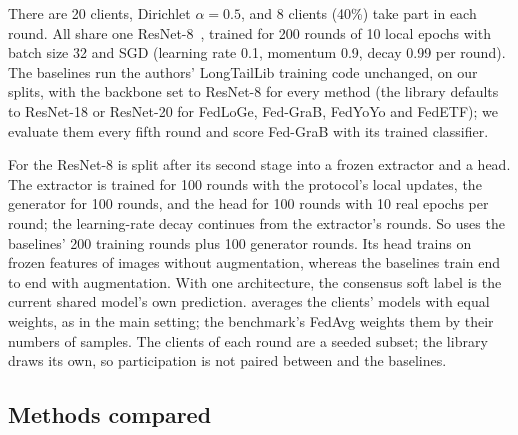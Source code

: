 There are 20 clients, Dirichlet $\alpha=0.5$, and 8 clients (40\%) take part in each round. All share one
ResNet-8~\cite{he2016resnet}, trained for 200 rounds of 10 local epochs with batch size 32 and SGD (learning rate 0.1,
momentum 0.9, decay 0.99 per round). The baselines run the authors' LongTailLib training code unchanged, on our
splits, with the backbone set to ResNet-8 for every method (the library defaults to ResNet-18 or ResNet-20 for
FedLoGe, Fed-GraB, FedYoYo and FedETF); we evaluate them every fifth round and score Fed-GraB with its trained
classifier.

For \ours the ResNet-8 is split after its second stage into a frozen extractor and a head. The extractor is trained
for 100 rounds with the protocol's local updates, the generator for 100 rounds, and the head for 100 rounds with 10
real epochs per round; the learning-rate decay continues from the extractor's rounds. So \ours uses the baselines'
200 training rounds plus 100 generator rounds. Its head trains on frozen features of images without augmentation,
whereas the baselines train end to end with augmentation. With one architecture, the consensus soft label is the
current shared model's own prediction. \ours averages the clients' models with equal weights, as in the main setting;
the benchmark's FedAvg weights them by their numbers of samples. The clients of each round are a seeded subset; the
library draws its own, so participation is not paired between \ours and the baselines.

\subsection{Methods compared}\label{sec:setup-methods}


